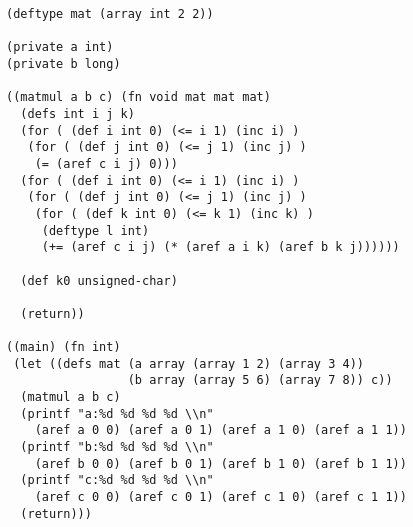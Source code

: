  \begin{verbatim}
(deftype mat (array int 2 2))

(private a int)
(private b long)

((matmul a b c) (fn void mat mat mat)
  (defs int i j k)
  (for ( (def i int 0) (<= i 1) (inc i) )
   (for ( (def j int 0) (<= j 1) (inc j) )
    (= (aref c i j) 0)))
  (for ( (def i int 0) (<= i 1) (inc i) )
   (for ( (def j int 0) (<= j 1) (inc j) )
    (for ( (def k int 0) (<= k 1) (inc k) )
     (deftype l int)
     (+= (aref c i j) (* (aref a i k) (aref b k j))))))
  
  (def k0 unsigned-char)

  (return))

((main) (fn int)
 (let ((defs mat (a array (array 1 2) (array 3 4))
                 (b array (array 5 6) (array 7 8)) c))
  (matmul a b c)
  (printf "a:%d %d %d %d \\n" 
    (aref a 0 0) (aref a 0 1) (aref a 1 0) (aref a 1 1))
  (printf "b:%d %d %d %d \\n" 
    (aref b 0 0) (aref b 0 1) (aref b 1 0) (aref b 1 1))
  (printf "c:%d %d %d %d \\n" 
    (aref c 0 0) (aref c 0 1) (aref c 1 0) (aref c 1 1))
  (return)))
\end{verbatim} 
